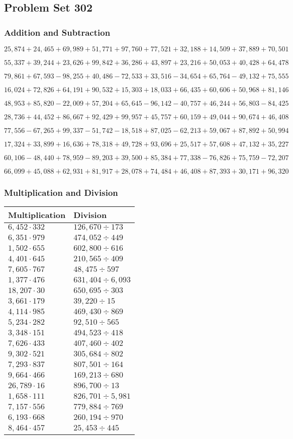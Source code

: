 \hypertarget{problem-set-302}{%
\subsection{Problem Set 302}\label{problem-set-302}}

\hypertarget{addition-and-subtraction}{%
\subsubsection{Addition and
Subtraction}\label{addition-and-subtraction}}

\(25,874+24,465+69,989+51,771+97,760+77,521+32,188+14,509+37,889+70,501\)

\(55,337+39,244+23,626+99,842+36,286+43,897+23,216+50,053+40,428+64,478\)

\(79,861+67,593-98,255+40,486-72,533+33,516-34,654+65,764-49,132+75,555\)

\(16,024+72,826+64,191+90,532+15,303+18,033+66,435+60,606+50,968+81,146\)

\(48,953+85,820-22,009+57,204+65,645-96,142-40,757+46,244+56,803-84,425\)

\(28,736+44,452+86,667+92,429+99,957+45,757+60,159+49,044+90,674+46,408\)

\(77,556-67,265+99,337-51,742-18,518+87,025-62,213+59,067+87,892+50,994\)

\(17,324+33,899+16,636+78,318+49,728+93,696+25,517+57,608+47,132+35,227\)

\(60,106-48,440+78,959-89,203+39,500+85,384+77,338-76,826+75,759-72,207\)

\(66,099+45,088+62,931+81,917+28,078+74,484+46,408+87,393+30,171+96,320\)

\hypertarget{multiplication-and-division}{%
\subsubsection{Multiplication and
Division}\label{multiplication-and-division}}

\begin{longtable}[]{@{}ll@{}}
\toprule
Multiplication & Division\tabularnewline
\midrule
\endhead
\(6,452\cdot332\) & \(126,670÷173\)\tabularnewline
\(6,351\cdot979\) & \(474,052÷449\)\tabularnewline
\(1,502\cdot655\) & \(602,800÷616\)\tabularnewline
\(4,401\cdot645\) & \(210,565÷409\)\tabularnewline
\(7,605\cdot767\) & \(48,475÷597\)\tabularnewline
\(1,377\cdot476\) & \(631,404÷6,093\)\tabularnewline
\(18,207\cdot30\) & \(650,695÷303\)\tabularnewline
\(3,661\cdot179\) & \(39,220÷15\)\tabularnewline
\(4,114\cdot985\) & \(469,430÷869\)\tabularnewline
\(5,234\cdot282\) & \(92,510÷565\)\tabularnewline
\(3,348\cdot151\) & \(494,523÷418\)\tabularnewline
\(7,626\cdot433\) & \(407,460÷402\)\tabularnewline
\(9,302\cdot521\) & \(305,684÷802\)\tabularnewline
\(7,293\cdot837\) & \(807,501÷164\)\tabularnewline
\(9,664\cdot466\) & \(169,213÷680\)\tabularnewline
\(26,789\cdot16\) & \(896,700÷13\)\tabularnewline
\(1,658\cdot111\) & \(826,701÷5,981\)\tabularnewline
\(7,157\cdot556\) & \(779,884÷769\)\tabularnewline
\(6,193\cdot668\) & \(260,194÷970\)\tabularnewline
\(8,464\cdot457\) & \(25,453÷445\)\tabularnewline
\bottomrule
\end{longtable}
